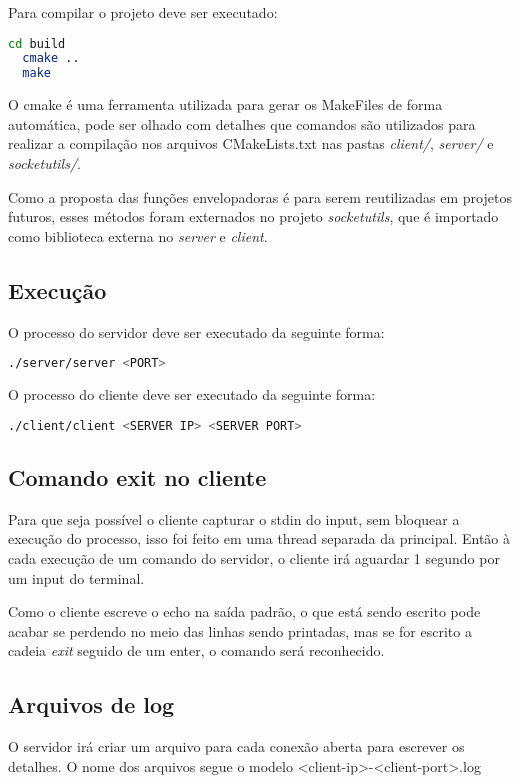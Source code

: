 \documentclass[12pt,a4paper]{report}
\begin{document}
Para compilar o projeto deve ser executado:

\begin{lstlisting}[language=bash]
  cd build
  cmake ..
  make
\end{lstlisting}

O cmake é uma ferramenta utilizada para gerar os MakeFiles de forma automática, pode ser olhado com detalhes que comandos são utilizados para realizar a compilação nos arquivos CMakeLists.txt nas pastas \emph{client/}, \emph{server/} e \emph{socketutils/}.

Como a proposta das funções envelopadoras é para serem reutilizadas em projetos futuros, esses métodos foram externados no projeto \emph{socketutils}, que é importado como biblioteca externa no \emph{server} e \emph{client}.

\subsection{Execução}

O processo do servidor deve ser executado da seguinte forma:
\begin{lstlisting}[language=bash]
  ./server/server <PORT>
\end{lstlisting}

O processo do cliente deve ser executado da seguinte forma:
\begin{lstlisting}[language=bash]
  ./client/client <SERVER IP> <SERVER PORT>
\end{lstlisting}

\subsection{Comando exit no cliente}
Para que seja possível o cliente capturar o stdin do input, sem bloquear a execução do processo, isso foi feito em uma thread separada da principal. Então à cada execução de um comando do servidor, o cliente irá aguardar 1 segundo por um input do terminal.

Como o cliente escreve o echo na saída padrão, o que está sendo escrito pode acabar se perdendo no meio das linhas sendo printadas, mas se for escrito a cadeia \emph{exit} seguido de um enter, o comando será reconhecido.

\subsection{Arquivos de log}

O servidor irá criar um arquivo para cada conexão aberta para escrever os detalhes. O nome dos arquivos segue o modelo <client-ip>-<client-port>.log
\end{document}
